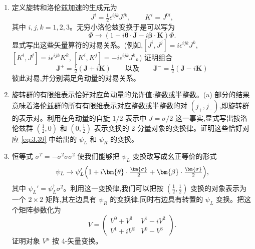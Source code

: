 \begin{enumerate}[label=(\alph*)]
  \item 定义旋转和洛伦兹加速的生成元为
    \begin{equation}
      J^i = \tfrac{1}{2}\epsilon^{ijk}J^{jk},\qquad
      K^i = J^{0i},
    \end{equation}
    其中 $i, j, k = 1, 2, 3$。无穷小洛伦兹变换于是可以写为
    \begin{equation}
      \Phi \to (1 - i\bm{\theta}\cdot\mathbf{J} - i\bm{\beta}\cdot\mathbf{K})\Phi .
    \end{equation}
    显式写出这些矢量算符的对易关系。(例如,$[J^i, J^j] = i\epsilon^{ijk}J^k$, $[K^i, J^j] =
    i\epsilon^{ijk}K^k$, $[K^i, K^j] = -i\epsilon^{ijk}J^k$。) 证明组合
    \begin{equation}
      \mathbf{J}^{+} = \tfrac{1}{2}(\mathbf{J} + i\mathbf{K})
      \qquad\text{以及}\qquad
      \mathbf{J}^{-} = \tfrac{1}{2}(\mathbf{J} - i\mathbf{K})
    \end{equation}
    彼此对易,并分别满足角动量的对易关系。
  \item 旋转群的有限维表示恰好对应角动量的允许值:整数或半整数。(a) 部分的结果意味着洛伦兹群的所有有限维表示对应整数或半整数的对 $(j_+, j_-)$,即旋转群的表示对。利用在角动量的自旋 $1/2$ 表示中 $J = \sigma/2$ 这一事实,显式写出按洛伦兹群 $(\tfrac{1}{2}, 0)$ 和 $(0, \tfrac{1}{2})$ 表示变换的 2 分量对象的变换律。证明这些恰好对应 \eqref{eq:3.39} 中给出的 $\psi_L$ 和 $\psi_R$ 的变换。
  \item 恒等式 $\sigma^T = -\sigma^2\sigma\sigma^2$ 使我们能够把 $\psi_L$ 变换改写成幺正等价的形式
    \begin{equation}
      \psi_L \to \psi_L'\Bigl( 1 + i\bm{\theta}\cdot\tfrac{\bm{\sigma}}{2}
        + \bm{\beta}\cdot\tfrac{\bm{\sigma}}{2} \Bigr),
    \end{equation}
    其中 $\psi_L' = \psi_L^{\dagger}\sigma^2$。利用这一变换律,我们可以把按 $(\tfrac{1}{2}, \tfrac{1}{2})$ 变换的对象表示为一个 $2\times2$ 矩阵,其左边具有 $\psi_R$ 的变换律,同时右边具有转置的 $\psi_L$ 变换。把这个矩阵参数化为
    \begin{equation}
      V = \begin{pmatrix}
        V^0 + V^3 & V^1 - iV^2\\
        V^1 + iV^2 & V^0 - V^3
      \end{pmatrix}.
    \end{equation}
    证明对象 $V^\mu$ 按 4-矢量变换。
\end{enumerate}

